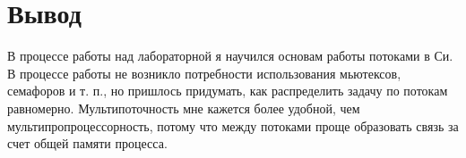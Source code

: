 \section{Вывод}

В процессе работы над лабораторной я научился основам работы потоками в Си. В процессе работы не возникло потребности использования мьютексов, семафоров и т. п., но пришлось придумать, как распределить задачу по потокам равномерно. Мультипоточность мне кажется более удобной, чем мультипропроцессорность, потому что между потоками проще образовать связь за счет общей памяти процесса.

